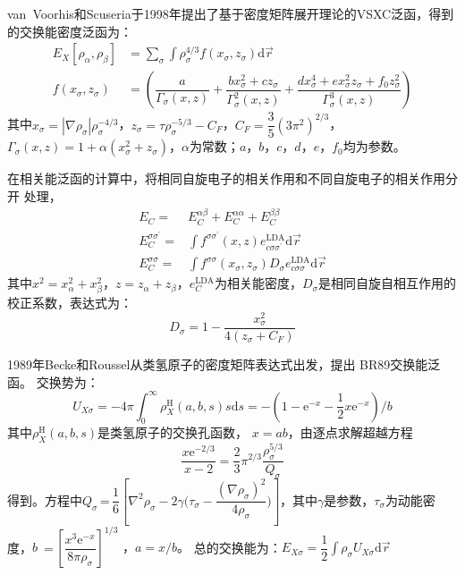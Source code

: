 van~Voorhis和Scuseria于1998年提出了基于密度矩阵展开理论\cite{PRC5-1472_1972,PRC11-1030_1975}的VSXC泛函\cite{JCP109-400_1998}，得到的交换能密度泛函为：
\begin{equation}
  \begin{aligned}
    E_X[\rho_{\alpha},\rho_{\beta}]&=\sum_{\sigma}\int\rho_{\sigma}^{4/3}{f(x_{\sigma},z_{\sigma})
    }\textrm{d}\vec r\\
    f(x_{\sigma},z_{\sigma})&=\left(\dfrac a{\Gamma_{\sigma}(x,z)}+\dfrac{bx_{\sigma}^2+cz_{\sigma}}{\Gamma_{\sigma}^2(x,z)}+\dfrac{dx_{\sigma}^4+ex_{\sigma}^2z_{\sigma}+f_0z_{\sigma}^2}{\Gamma_{\sigma}^3(x,z)}\right) 
  \end{aligned}
  \label{ed:def-22}
\end{equation}
其中$x_{\sigma}=|\nabla\rho_{\sigma}|\rho_{\sigma}^{-4/3}$，$z_{\sigma}=\tau\rho_{\sigma}^{-5/3}-C_F$，$C_F=\dfrac35(3\pi^2)^{2/3}$，$\Gamma_{\sigma}(x,z)=1+\alpha(x_{\sigma}^2+z_{\sigma})$，\linebreak $\alpha$为常数；$a$，$b$，$c$，$d$，$e$，$f_0$均为参数。

{在}相关能泛函的计算中，将相同自旋电子的相关作用和不同自旋{电子}的相关作用分开%
{处理}\cite{TCA49-143_1978}，%
\begin{equation}
  \begin{aligned}
    E_C=&E_C^{\alpha\beta}+E_C^{\alpha\alpha}+E_C^{\beta\beta}\\
    E_C^{\sigma\sigma^{\prime}}=&\int f^{\sigma\sigma^{\prime}}(x,z)e_{c\sigma\sigma^{\prime}}^{\mathrm{LDA}}\textrm{d}\vec r\\
    E_C^{\sigma\sigma}=&\int f^{\sigma\sigma}(x_{\sigma},z_{\sigma})
    D_{\sigma}e_{c\sigma\sigma}^{\mathrm{LDA}}\textrm{d}\vec r
  \end{aligned}
  \label{eq:dft-23}
\end{equation}
其中$x^2=x_{\alpha}^2+x_{\beta}^2$，$z=z_{\alpha}+z_{\beta}$，{$e_C^{\mathrm{LDA}}$为相关能密度，}$D_{\sigma}$是相同自旋自相互作用的校正系数，表达式为：
$$D_{\sigma}=1-\dfrac{x_{\sigma}^2}{4(z_{\sigma}+C_F)}$$

1989年Becke和Roussel从类氢原子的密度矩阵表达式出发，提出%
BR89交换能泛函\cite{PRA39-3761_1989}。
交换势为：
$$U_{X\sigma}=-4\pi\int_0^{\infty}\rho_X^{\mathrm{H}}(a,b,s)s\textrm{d}s=-\left(1-\textrm{e}^{-x}-\frac12x\textrm{e}^{-x}\right)/b$$
其中$\rho_X^{\mathrm{H}}(a,b,s)$是类氢原子的交换孔函数，%
{$x=ab$}，由{逐点求解}超越方程
$$\dfrac{x\textrm{e}^{-2/3}}{x-2}=\dfrac23\pi^{2/3}\dfrac{\rho_{\sigma}^{5/3}}{Q_{\sigma}}$$
得到。方程中$Q_{\sigma}$\,=\,$\dfrac16\left[\nabla^2\rho_{\sigma}-2\gamma\bigl(\tau_{\sigma}-\dfrac{(\nabla\rho_{\sigma})^2}{4\rho_{\sigma}}\bigr)\right]$，其中$\gamma$是参数，$\tau_{\sigma}$为动能密度{，}\linebreak $b$%
\,=\,$\left[\dfrac{x^3\textrm{e}^{-x}}{8\pi\rho_{\sigma}}\right]^{1/3}$%
{，$a=x/b$。}%
总的交换能为：$E_{X\sigma}=\dfrac12\displaystyle\int\rho_{\sigma}U_{X\sigma}\textrm{d}\vec r$

